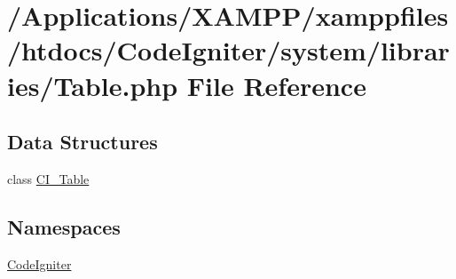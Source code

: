 \hypertarget{_table_8php}{}\section{/\+Applications/\+X\+A\+M\+P\+P/xamppfiles/htdocs/\+Code\+Igniter/system/libraries/\+Table.php File Reference}
\label{_table_8php}
\subsection*{Data Structures}
\begin{DoxyCompactItemize}
\item 
class \mbox{\hyperlink{class_c_i___table}{C\+I\+\_\+\+Table}}
\end{DoxyCompactItemize}
\subsection*{Namespaces}
\begin{DoxyCompactItemize}
\item 
 \mbox{\hyperlink{namespace_code_igniter}{Code\+Igniter}}
\end{DoxyCompactItemize}
